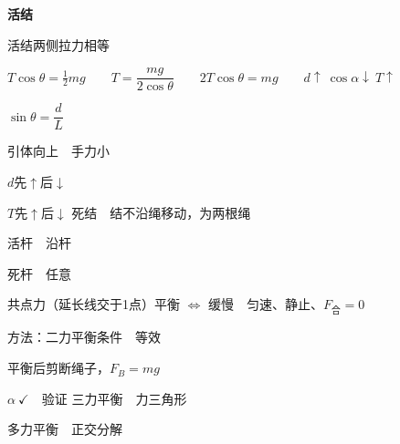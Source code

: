 \textbf{活结}


活结两侧拉力相等


$T\cos\theta=\frac12 mg$　　$T=\dfrac{mg}{2\cos\theta}$　　$2T\cos\theta=mg$　　$d\uparrow\ \cos\alpha\downarrow\ T\uparrow$ %

$\sin\theta=\dfrac{d}{L}$


引体向上　手力小

$d$先$\uparrow$后$\downarrow$

$T$先$\uparrow$后$\downarrow$
死结　结不沿绳移动，为两根绳

活杆　沿杆

死杆　任意

共点力（延长线交于1点）平衡 $\Leftrightarrow$ 缓慢　匀速、静止、$F_{\text{合}}=0$ %

方法：二力平衡条件　等效

平衡后剪断绳子，$F_B=mg$

$\alpha\ \checkmark$　验证
三力平衡　力三角形

多力平衡　正交分解

